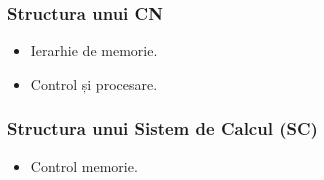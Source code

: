\begin{frame}
    \frametitle{Structura unui CN}
    \newsavebox{\asciistructcn}
    \begin{lrbox}{\asciistructcn}
        \begin{varwidth}{\maxdimen}
        \end{varwidth}
    \end{lrbox}%

    \begin{figure}[h]
        \centering
        \scalebox{0.65}{\usebox{\asciistructcn}}
    \end{figure}
    \begin{itemize}
        \item Ierarhie de memorie.
        \item Control și procesare.
    \end{itemize}
\end{frame}


\begin{frame}
    \frametitle{Structura unui Sistem de Calcul (SC)}
    \newsavebox{\asciistructsoc}
    \begin{lrbox}{\asciistructsoc}
        \begin{varwidth}{\maxdimen}
        \end{varwidth}
    \end{lrbox}%

    \begin{figure}[h]
        \centering
        \scalebox{0.47}{\usebox{\asciistructsoc}}
    \end{figure}
    \begin{itemize}
        \item Control memorie.
    \end{itemize}
\end{frame}